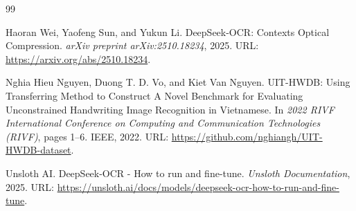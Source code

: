 
\newpage
{}
\begin{thebibliography}{99}

Haoran Wei, Yaofeng Sun, and Yukun Li.
\newblock DeepSeek-OCR: Contexts Optical Compression.
\newblock \textit{arXiv preprint arXiv:2510.18234}, 2025.
\newblock URL: \url{https://arxiv.org/abs/2510.18234}.

Nghia Hieu Nguyen, Duong T. D. Vo, and Kiet Van Nguyen.
\newblock UIT-HWDB: Using Transferring Method to Construct A Novel Benchmark for Evaluating Unconstrained Handwriting Image Recognition in Vietnamese.
\newblock In \textit{2022 RIVF International Conference on Computing and Communication Technologies (RIVF)}, pages 1--6. IEEE, 2022.
\newblock URL: \url{https://github.com/nghiangh/UIT-HWDB-dataset}.

Unsloth AI.
\newblock DeepSeek-OCR - How to run and fine-tune.
\newblock \textit{Unsloth Documentation}, 2025.
\newblock URL: \url{https://unsloth.ai/docs/models/deepseek-ocr-how-to-run-and-fine-tune}.

\end{thebibliography}